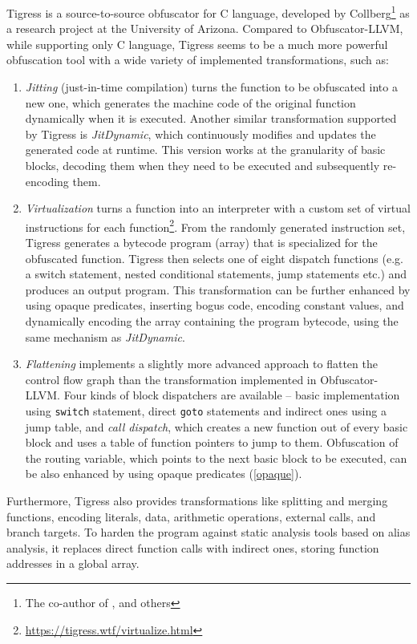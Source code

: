 \documentclass[
  digital, %
  notable,   %
  twoside, %
  nolof,     %
  nolot,     %
]{fithesis3}
\theoremstyle{definition}
\begin{document}
Tigress is a source-to-source obfuscator for C language, developed by Collberg\footnote{The co-author of \cite{taxonomy_obf}, \cite{manufacturing_opaque} and others} as a research project at the University of Arizona. Compared to Obfuscator-LLVM, while supporting only C language, Tigress seems to be a much more powerful obfuscation tool with a wide variety of implemented transformations, such as:
\begin{enumerate}
    \item \textit{Jitting} (just-in-time compilation) turns the function to be obfuscated into a new one, which generates the machine code of the original function dynamically when it is executed. Another similar transformation supported by Tigress is \textit{JitDynamic}, which continuously modifies and updates the generated code at runtime. This version works at the granularity of basic blocks, decoding them when they need to be executed and subsequently re-encoding them.
    
    \item \textit{Virtualization} turns a function into an interpreter with a custom set of virtual instructions for each function\footnote{\url{https://tigress.wtf/virtualize.html}}. From the randomly generated instruction set, Tigress generates a bytecode program (array) that is specialized for the obfuscated function. Tigress then selects one of eight dispatch functions (e.g. a switch statement, nested conditional statements, jump statements etc.) and produces an output program. This transformation can be further enhanced by using opaque predicates, inserting bogus code, encoding constant values, and dynamically encoding the array containing the program bytecode, using the same mechanism as \textit{JitDynamic}. 
    
    \item \textit{Flattening} implements a slightly more advanced approach to flatten the control flow graph than the transformation implemented in Obfuscator-LLVM. Four kinds of block dispatchers are available -- basic implementation using \texttt{switch} statement, direct \texttt{goto} statements and indirect ones using a jump table, and \textit{call dispatch}, which creates a new function out of every basic block and uses a table of function pointers to jump to them. Obfuscation of the routing variable, which points to the next basic block to be executed, can be also enhanced by using opaque predicates (\ref{opaque}).
\end{enumerate}
Furthermore, Tigress also provides transformations like splitting and merging functions, encoding literals, data, arithmetic operations, external calls, and branch targets. To harden the program against static analysis tools based on alias analysis, it replaces direct function calls with indirect ones, storing function addresses in a global array. 
\end{document}
